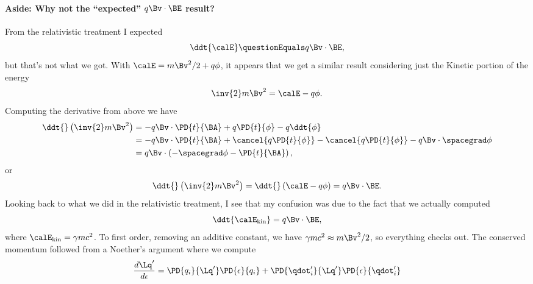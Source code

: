 {\paragraph{Aside: Why not the ``expected'' \(q \Bv \cdot \BE\) result?}
%
From the relativistic treatment I expected
%
\begin{equation}\label{eqn:classicalMechanicsPs2:530}
\ddt{\calE} \questionEquals q \Bv \cdot \BE,
\end{equation}
%
but that's not what we got.  With \(\calE = m \Bv^2/2 + q \phi\), it appears that we get a similar result considering just the Kinetic portion of the energy
%
\begin{equation}\label{eqn:classicalMechanicsPs2:550}
\inv{2} m \Bv^2 = \calE - q \phi.
\end{equation}
%
Computing the derivative from above we have
%
\begin{equation}\label{eqn:classicalMechanicsPs2:1170}
\begin{aligned}
\ddt{}\left(
\inv{2} m \Bv^2 \right)
&= -q \Bv \cdot \PD{t}{\BA} + q \PD{t}{\phi} - q \ddt{\phi} \\
&= -q \Bv \cdot \PD{t}{\BA} + \cancel{q \PD{t}{\phi}} - \cancel{q \PD{t}{\phi}} - q \Bv \cdot \spacegrad \phi \\
&= q \Bv \cdot \left( -\spacegrad \phi -\PD{t}{\BA} \right),
\end{aligned}
\end{equation}
%
or
\begin{equation}\label{eqn:classicalMechanicsPs2:570}
\ddt{} \left(
\inv{2} m \Bv^2 \right) = \ddt{} \left( \calE - q \phi \right) = q \Bv \cdot \BE.
\end{equation}
%
Looking back to what we did in the relativistic treatment, I see that my confusion was due to the fact that we actually computed
%
\begin{equation}\label{eqn:classicalMechanicsPs2:530b}
\ddt{\calE_{\mathrm{kin}}} = q \Bv \cdot \BE,
\end{equation}
%
where \(\calE_{\mathrm{kin}} = \gamma m c^2\).  To first order, removing an additive constant, we have \(\gamma m c^2 \approx m \Bv^2/2\), so everything checks out.
%
%
The conserved momentum followed from a Noether's argument where we compute
%
\begin{equation}\label{eqn:classicalMechanicsPs2:610}
\begin{aligned}
\frac{d\Lq'}{d\epsilon}
&= \PD{q_i}{\Lq'} \PD{\epsilon}{q_i} +\PD{\qdot_i'}{\Lq'} \PD{\epsilon}{\qdot_i'} \\

\end{aligned}
\end{equation}}
